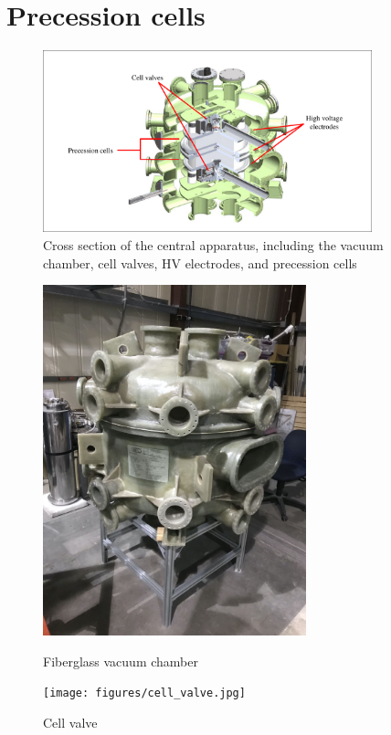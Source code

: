 
\section{Precession cells}\label{sec:precession_cells}


\begin{figure}
    \centering
    \includegraphics[width=0.85\textwidth]{figures/vacuum_chamber_cross.pdf}
    \caption
    {Cross section of the central apparatus, including the vacuum chamber, cell valves, HV electrodes, and precession cells}
    \label{fig:central_app_cross}
\end{figure}

\begin{figure}
\centering
\begin{minipage}{.5\textwidth}
    \centering
    \includegraphics[height=4in]{figures/vacuum_chamber.jpg}
    \caption{Fiberglass vacuum chamber}
    \label{fig:vacuum_chamber}
\end{minipage}%
\begin{minipage}{.5\textwidth}
    \centering
    \texttt{[image: figures/cell\_valve.jpg]}
    \caption
    {Cell valve}
    \label{fig:cell_valve}
\end{minipage}
\end{figure}

